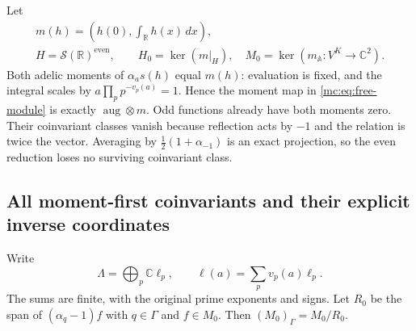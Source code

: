 \documentclass[11pt,a4paper]{article}
\theoremstyle{definition}\newtheorem{definition}[theorem]{Definition}
\newcommand{\C}{\mathbb C}\newcommand{\R}{\mathbb R}
\providecommand{\aug}{\operatorname{aug}}
\begin{document}
Let
\[
 \begin{gathered} m(h)=\left(h(0),\int_{\mathbb R}h(x)\,dx\right),\\
 H=\mathcal S(\mathbb R)^{\mathrm{even}},\qquad H_0=\ker(m|_H),
 \quad M_0=\ker(m_{\mathbb A}:V^K\to\C^2).
 \end{gathered}\tag{MC3}\label{mc:eq:moments}
\]
Both adelic moments of $\alpha_as(h)$ equal $m(h)$: evaluation
is fixed, and the integral scales by
$a\prod_p p^{-v_p(a)}=1$. Hence the moment map in
\eqref{mc:eq:free-module} is exactly $\aug\otimes m$.
Odd functions already have both moments zero. Their coinvariant
classes vanish because reflection acts by $-1$ and the relation
is twice the vector. Averaging by $\tfrac12(1+\alpha_{-1})$ is
an exact projection, so the even reduction loses no surviving
coinvariant class.

\subsection{All moment-first coinvariants and their explicit inverse coordinates}

Write
\[
 \Lambda=\bigoplus_p\C\ell_p,
 \qquad \ell(a)=\sum_pv_p(a)\ell_p.
 \tag{MC4}\label{mc:eq:prime-vectors}
\]
The sums are finite, with the original prime exponents and signs.
Let $R_0$ be the span of $(\alpha_q-1)f$ with $q\in\Gamma$ and
$f\in M_0$. Then $(M_0)_\Gamma=M_0/R_0$.
\end{document}
